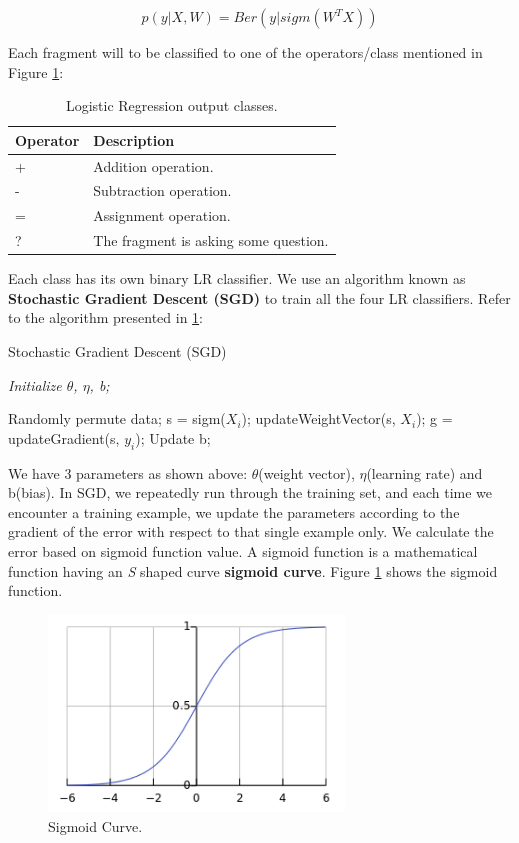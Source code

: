 \documentclass[11pt]{article}
\begin{document}
\begin{equation} p(y|X,W) = Ber(y|sigm(W^{T}X)) \end{equation}

Each fragment will to be classified to one of the operators/class mentioned in Figure \ref{figure:20}:

\begin{table}[h!]
\centering
\begin{tabular}{ | m{5em} | m{20em} |}
\hline
 \textbf{Operator} & \textbf{Description}\\
\hline
+ & Addition operation. \\
\hline
- & Subtraction operation. \\
\hline
= & Assignment operation. \\
\hline
? & The fragment is asking some question.\\
\hline
\end{tabular}
\caption{Logistic Regression output classes.}
\label{figure:20}
\end{table}

Each class has its own binary LR classifier. We use an algorithm known as \textbf{Stochastic Gradient Descent (SGD)} to train all the four LR classifiers. Refer to the algorithm presented in \ref{figure:21}:

\begin{algorithm}
\caption{Stochastic Gradient Descent (SGD)}
\label{figure:21}
\textit{Initialize $\theta$, $\eta$, b;}
\begin{algorithmic}
\Repeat 
\State Randomly permute data;
\State s = sigm($X_{i}$);
\State updateWeightVector(s, $X_{i}$);
\State g = updateGradient(s, $y_{i}$);
\State Update b;
\EndFor
\Until
\end{algorithmic}
\end{algorithm}

We have 3 parameters as shown above: $\theta$(weight vector), $\eta$(learning rate) and b(bias). In SGD, we repeatedly run through the training set, and each time we encounter a training example, we update the parameters according to the gradient of the error with respect to that single example only. We calculate the error based on sigmoid function value. A sigmoid function is a mathematical function having an \textit{S} shaped curve \textbf{sigmoid curve}. Figure \ref{figure:21} shows the sigmoid function.

\begin{figure}[h!]
\includegraphics[width=0.7\textwidth]{Figure2}
\centering
\caption{Sigmoid Curve.}
\label{figure:21}
\end{figure}
\end{document}
